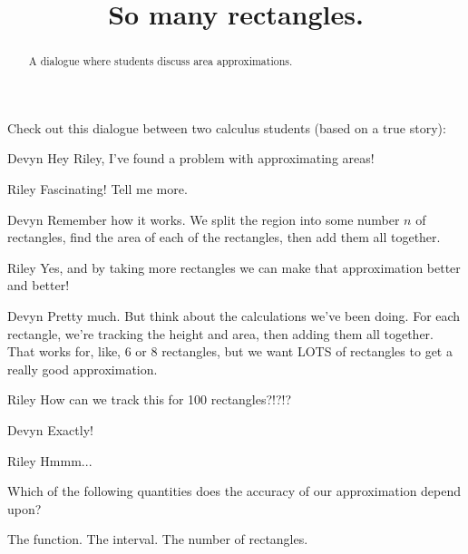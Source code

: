 \documentclass{ximera}
\title[Break-Ground:]{So many rectangles.}
\begin{document}
\begin{abstract}
A dialogue where students discuss area approximations.
\end{abstract}
\maketitle

Check out this dialogue between two calculus students (based on a true story):

\begin{dialogue}
\item[Devyn] Hey Riley, I've found a problem with approximating areas!
\item[Riley] Fascinating!  Tell me more.
\item[Devyn] Remember how it works.  We split the region into some number $n$ of 
				rectangles, find the area of each of the rectangles, then add
				them all together.
\item[Riley] Yes, and by taking more rectangles we can make that approximation
				better and better!
\item[Devyn] Pretty much.  But think about the calculations we've been doing.  
				For each rectangle, we're tracking the height and area, then
				adding them all together.  That works for, like, 6 or 8 
				rectangles, but we want LOTS of rectangles to get a really
				good approximation.
\item[Riley] How can we track this for 100 rectangles?!?!?
\item[Devyn] Exactly!
\item[Riley] Hmmm...
\end{dialogue}

\begin{problem}
	Which of the following quantities does the accuracy of our approximation depend upon?
	\begin{selectAll}
		\choice[correct] The function.
		\choice[correct] The interval.
		\choice[correct] The number of rectangles.
	\end{selectAll}
\end{problem}


\end{document}
